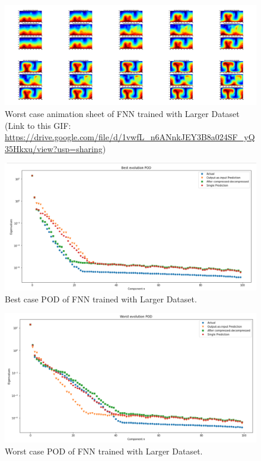 \begin{figure}[H]
    \centering
    \caption{Worst case animation sheet of FNN trained with Larger Dataset (Link to this GIF: 
    \url{https://drive.google.com/file/d/1vwfL_n6ANnkJEY3B8a024SF_yQ35Hkxu/view?usp=sharing})}
    \includegraphics[scale=0.10]{figures/mantle_convection_images/larger_dataset/FNN_Worst_GIF_sheet.png}
\end{figure}


\begin{figure}[H]
    \caption{Best case POD of FNN trained with Larger Dataset.}
    \includegraphics[scale=0.5]{figures/mantle_convection_images/larger_dataset/FNN_Best_POD.png}
\end{figure}

\begin{figure}[H]
    \caption{Worst case POD of FNN trained with Larger Dataset.}
    \includegraphics[scale=0.5]{figures/mantle_convection_images/larger_dataset/FNN_Worst_POD.png}
\end{figure}

